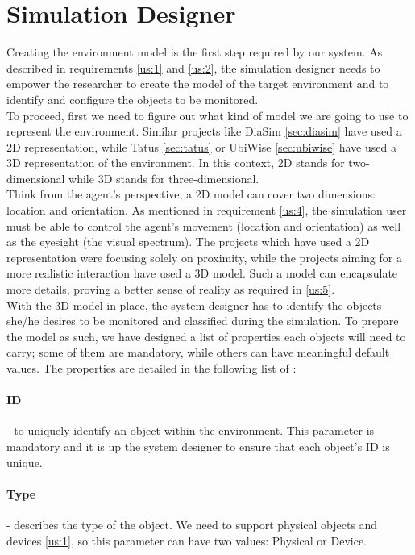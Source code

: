 \section{Simulation Designer} %
\label{sec:simulation_designer}
Creating the environment model is the first step required by our system. As described in requirements \ref{us:1} and \ref{us:2}, the simulation designer needs to empower the researcher to create the model of the target environment and to identify and configure the objects to be monitored.\\

To proceed, first we need to figure out what kind of model we are going to use to represent the environment. Similar projects like DiaSim \ref{sec:diasim} have used a 2D representation, while Tatus \ref{sec:tatus} or UbiWise \ref{sec:ubiwise} have used a 3D representation of the environment. In this context, 2D stands for two-dimensional while 3D stands for three-dimensional.\\

Think from the agent's perspective, a 2D model can cover two dimensions: location and orientation. As mentioned in requirement \ref{us:4}, the simulation user must be able to control the agent's movement (location and orientation) as well as the eyesight (the visual spectrum). The projects which have used a 2D representation were focusing solely on proximity, while the projects aiming for a more realistic interaction have used a 3D model. Such a model can encapsulate more details, proving a better sense of reality as required in \ref{us:5}.\\

With the 3D model in place, the system designer has to identify the objects she/he desires to be monitored and classified during the simulation. To prepare the model as such, we have designed a list of properties each objects will need to carry; some of them are mandatory, while others can have meaningful default values. The properties are detailed in the following list of :
\paragraph{ID} - to uniquely identify an object within the environment. This parameter is mandatory and it is up the system designer to ensure that each object's ID is unique.

\paragraph{Type} - describes the type of the object. We need to support physical objects and devices \ref{us:1}, so this parameter can have two values: Physical or Device.
